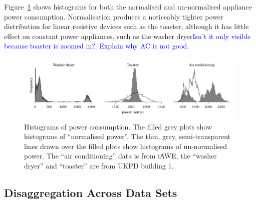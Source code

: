 \documentclass{sig-alternate}
\newcommand{\bluecolor}[1]{\textcolor{blue}{#1}}
\begin{document}
Figure~\ref{fig:power_histograms} shows
histograms for both the normalised and un-normalised appliance power
consumption. Normalisation produces a noticeably tighter power
distribution for linear resistive devices such as the toaster, although it has
little effect on constant power appliances, such as the washer dryer\bluecolor{Isn't it only visible because toaster is zoomed in?}.  \bluecolor{Explain why AC is not good.}

\begin{figure}[!t]
  \centering
  \includegraphics{figures/power_histograms.pdf} 
  \caption{Histograms of power consumption. The filled grey plots show
    histograms of ``normalised power''.  The thin, grey,
    semi-transparent lines drawn over the filled plots show histograms
    of un-normalised power.  The ``air conditioning'' data is from
    iAWE, the ``washer dryer'' and ``toaster'' are from UKPD building 1.}
  \label{fig:power_histograms} 
\end{figure}

\subsection{Disaggregation Across Data Sets}
\end{document}
